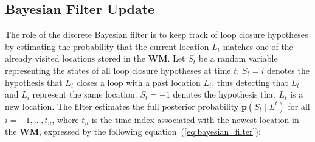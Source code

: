 \subsection{Bayesian Filter Update}
\label{sec:bayesian_filter_update}
The role of the discrete Bayesian filter is to keep track of loop closure hypotheses by estimating the probability that the current location $L_t$ matches one of the already visited locations stored in the \textbf{WM}. Let $S_t$ be a random variable representing the states of all loop closure hypotheses at time $t$. $S_t = i$ denotes the hypothesis that $L_t$ closes a loop with a past location $L_i$, thus detecting that $L_t$ and $L_i$ represent the same location. $S_t = -1$ denotes the hypothesis that $L_t$ is a new location. The filter estimates the full posterior probability $\mathbf{p}(S_t \mid L^t)$ for all $i = -1, \ldots, t_n$, where $t_n$ is the time index associated with the newest location in the \textbf{WM}, expressed by the following equation~(\ref{eq:bayesian_filter}):


